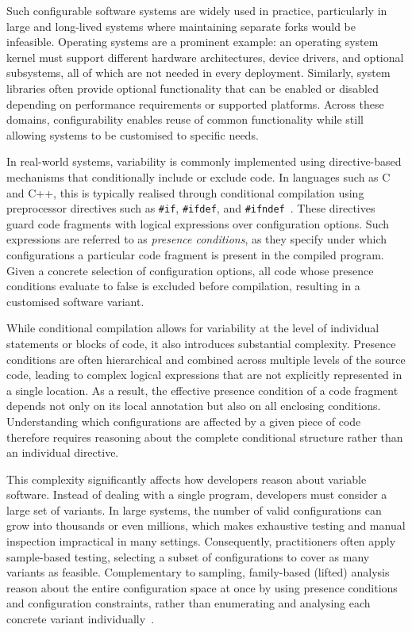 Such configurable software systems are widely used in practice, particularly in large and long-lived systems where maintaining separate forks would be infeasible. Operating systems are a prominent example: an operating system kernel must support different hardware architectures, device drivers, and optional subsystems, all of which are not needed in every deployment. Similarly, system libraries often provide optional functionality that can be enabled or disabled depending on performance requirements or supported platforms. Across these domains, configurability enables reuse of common functionality while still allowing systems to be customised to specific needs.

In real-world systems, variability is commonly implemented using directive-based mechanisms that conditionally include or exclude code. In languages such as C and C++, this is typically realised through conditional compilation using preprocessor directives such as \texttt{\#if}, \texttt{\#ifdef}, and \texttt{\#ifndef}~\cite{Bittner2022_edits}. These directives guard code fragments with logical expressions over configuration options. Such expressions are referred to as \emph{presence conditions}, as they specify under which configurations a particular code fragment is present in the compiled program. Given a concrete selection of configuration options, all code whose presence conditions evaluate to false is excluded before compilation, resulting in a customised software variant.~\cite{Bittner2022_edits}

While conditional compilation allows for variability at the level of individual statements or blocks of code, it also introduces substantial complexity. Presence conditions are often hierarchical and combined across multiple levels of the source code, leading to complex logical expressions that are not explicitly represented in a single location. As a result, the effective presence condition of a code fragment depends not only on its local annotation but also on all enclosing conditions. Understanding which configurations are affected by a given piece of code therefore requires reasoning about the complete conditional structure rather than an individual directive. 

This complexity significantly affects how developers reason about variable software. Instead of dealing with a single program, developers must consider a large set of variants. In large systems, the number of valid configurations can grow into thousands or even millions, which makes exhaustive testing and manual inspection impractical in many settings. Consequently, practitioners often apply sample-based testing, selecting a subset of configurations to cover as many variants as feasible. Complementary to sampling, family-based (lifted) analysis reason about the entire configuration space at once by using presence conditions and configuration constraints, rather than enumerating and analysing each concrete variant individually~\cite{apel2013_featureOrientedSoftwareProductLines}.

